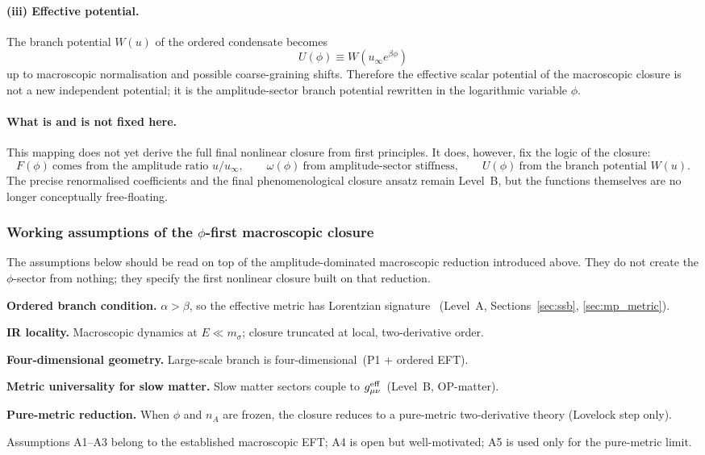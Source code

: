 \documentclass[11pt,a4paper]{article}
\numberwithin{equation}{section}
\begin{document}
\paragraph{(iii) Effective potential.}
The branch potential $W(u)$ of the ordered condensate becomes
\[
U(\phi)\equiv W(u_\infty e^{\beta\phi})
\]
up to macroscopic normalisation and possible coarse-graining shifts.
Therefore the effective scalar potential of the macroscopic closure is
not a new independent potential; it is the amplitude-sector branch
potential rewritten in the logarithmic variable $\phi$.

\paragraph{What is and is not fixed here.}
This mapping does not yet derive the full final nonlinear closure from
first principles.
It does, however, fix the logic of the closure:
\[
F(\phi)\ \text{comes from the amplitude ratio }u/u_\infty,\qquad
\omega(\phi)\ \text{from amplitude-sector stiffness},\qquad
U(\phi)\ \text{from the branch potential }W(u).
\]
The precise renormalised coefficients and the final phenomenological
closure ansatz remain Level~B, but the functions themselves are no
longer conceptually free-floating.

\subsubsection*{Working assumptions of the $\phi$-first macroscopic closure}

The assumptions below should be read on top of the
amplitude-dominated macroscopic reduction introduced above.
They do not create the $\phi$-sector from nothing; they specify the
first nonlinear closure built on that reduction.

\begin{description}[noitemsep,leftmargin=2.2em]
  \item[A1] \textbf{Ordered branch condition.}
    $\alpha>\beta$, so the effective metric has Lorentzian signature
    ~(Level~A, Sections~\ref{sec:ssb}, \ref{sec:mp_metric}).
  \item[A2] \textbf{IR locality.}
    Macroscopic dynamics at $E\ll m_\sigma$; closure truncated at local,
    two-derivative order.
  \item[A3] \textbf{Four-dimensional geometry.}
    Large-scale branch is four-dimensional~(P1 + ordered EFT).
  \item[A4] \textbf{Metric universality for slow matter.}
    Slow matter sectors couple to $g^{\rm eff}_{\mu\nu}$~(Level~B,
    OP-matter).
  \item[A5] \textbf{Pure-metric reduction.}
    When $\phi$ and $n_A$ are frozen, the closure reduces to a
    pure-metric two-derivative theory (Lovelock step only).
\end{description}
Assumptions A1--A3 belong to the established macroscopic EFT;
A4 is open but well-motivated; A5 is used only for the pure-metric limit.
\end{document}
